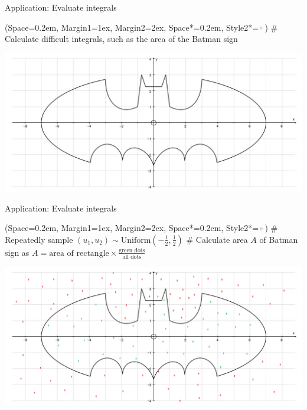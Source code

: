 \documentclass[12pt, aspectratio=149]{beamer}
\newcommand{\listSpace}{0.2em}
\theoremstyle{plain}
\begin{document}
\begin{frame}[fragile]{Application: Evaluate integrals}
	\begin{easylist}
		\ListProperties(Space=\listSpace, Margin1=1ex, Margin2=2ex, Space*=\listSpace, Style2*=$\color{bggraydark}\blacktriangleright$\space)
		# Calculate difficult integrals, such as the area of the Batman sign
	\end{easylist}
	\includegraphics[scale=0.3]{figs/bat_signal.png}
\end{frame}

\begin{frame}[fragile]{Application: Evaluate integrals}
	\begin{easylist}
		\ListProperties(Space=\listSpace, Margin1=1ex, Margin2=2ex, Space*=\listSpace, Style2*=$\color{bggraydark}\blacktriangleright$\space)
		# Repeatedly sample $(u_1, u_2) \sim \text{Uniform}(-\frac{1}{2}, \frac{1}{2})$
		# Calculate area $A$ of Batman sign as $A = \textrm{area of rectangle} \times \frac{\textrm{green dots}}{\textrm{all dots}}$
	\end{easylist}
	\includegraphics[scale=0.3]{figs/bat_signal_mcs.png}
\end{frame}
\end{document}
